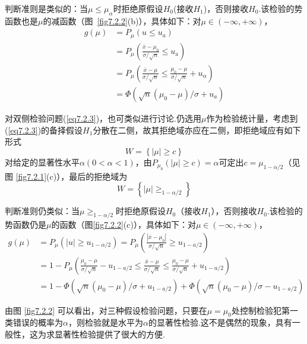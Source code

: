 判断准则是类似的：当$\mu\le\mu_{\alpha}$时拒绝原假设$H_{0}$(接收$H_{1}$)，否则接收$H_{0}$.该检验的势函数也是$\mu $的减函数（图~\ref{fig7.2.2}(b)），具体如下：对$\mu \in(-\infty,+\infty)$，
\begin{align*}
g ( \mu ) &= P _ { \mu } \left( u \leq u _ { a } \right)\\
&= P _ { \mu } \left( \frac { \overline { x } - \mu _ { 0 } } { \sigma / \sqrt { n } } \leq u _ { \mathrm { a } } \right)\\
&= P _ { \mu } \left( \frac { \overline { x } - \mu } { \sigma / \sqrt { n } } \leq \frac { \mu _ { 0 } - \mu } { \sigma / \sqrt { n } } + u _ { \alpha } \right)\\
&= \Phi \left( \sqrt { n } \left( \mu _ { 0 } - \mu \right) / \sigma + u _ { a } \right)
\end{align*}

对双侧检验问题(\ref{eq7.2.3})，也可类似进行讨论.仍选用$\mu$作为检验统计量，考虑到(\ref{eq7.2.3})的备择假设$H_{1}$分散在二侧，故其拒绝域亦应在二侧，即拒绝域应有如下形式
\[W=\left\{\left|\mu\right|\geq c\right\}\]
对给定的显著性水平$\alpha(0<\alpha<1)$，由$P_{\mu_0}\left(\left|\mu\right|\geq c\right)=\alpha $可定出$c=\mu_{1-\alpha/2}$（见图 \ref{fig7.2.1}(c)），最后的拒绝域为
\begin{equation}\label{eq7.2.8}
W=\left\{\left|\mu\right|\geq_{1-\alpha/2}\right\}
\end{equation}

判断准则仍类似：当$\mu\geq_{1-\alpha/2}$时拒绝原假设$H_{0}$（接收$H_{1}$），否则接收$H_{0}$.该检验的势函数仍是$\mu $的函数（图\ref{fig7.2.2}(c)），具体如下：对$\mu \in (-\infty,+\infty)$，
\begin{align*}
	g ( \mu ) &= P _ { \mu } \left( | u | \geq u _ { 1 - \alpha / 2 } \right) = P _ { \mu } \left( \frac { \left| \overline { x } - \mu _ { 0 } \right| } { \sigma / \sqrt { n } } \geq u _ { 1 - a / 2 } \right)\\
	&=1-P_{\mu}\left(\frac{\mu_0-\mu}{\sigma/\sqrt{n}}-u_{1-a/2}\le\frac{\overline{x}-\mu}{\sigma/\sqrt{n}}\le\frac{\mu_0-\mu}{\sigma/\sqrt{n}}+u_{1-a/2}\right)\\
	&= 1 - \Phi \left( \sqrt { n } \left( \mu _ { 0 } - \mu \right) / \sigma + u _ { 1 - a / 2 } \right) + \Phi \left( \sqrt { n } \left( \mu _ { 0 } - \mu \right) / \sigma - u _ { 1 - a / 2 } \right)
\end{align*}

由图 \ref{fig7.2.2} 可以看出，对三种假设检验问题，只要在$\mu=\mu_{ 0 }$处控制检验犯第一类错误的概率为$\alpha$，则检验就是水平为$\alpha$的显著性检验.这不是偶然的现象，具有一般性，这为求显著性检验提供了很大的方便.

